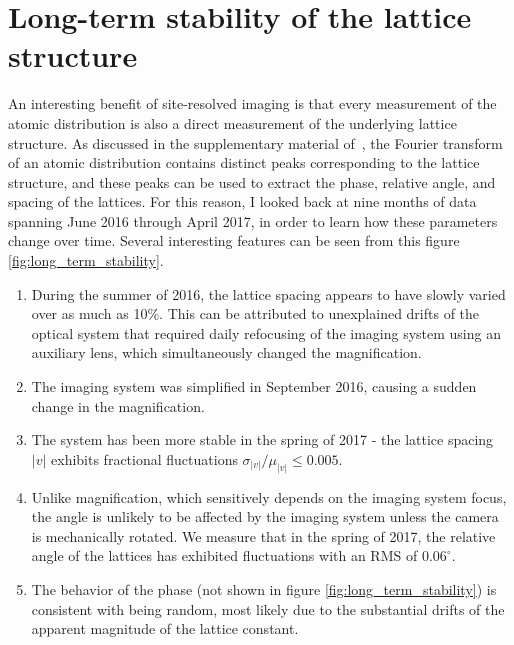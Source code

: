 \documentclass[twocolumn,aps,pra,showpacs,preprintnumbers,bibnotes]{revtex4-1}
\begin{document}
\section{Long-term stability of the lattice structure}
An interesting benefit of site-resolved imaging is that every measurement of the atomic distribution is also a direct measurement of the underlying lattice structure. 
As discussed in the supplementary material of~\cite{Parsons2016, Greif2016}, the Fourier transform of an atomic distribution contains distinct peaks corresponding to the lattice structure, and these peaks can be used to extract the phase, relative angle, and spacing of the lattices.
For this reason, I looked back at nine months of data spanning June 2016 through April 2017, in order to learn how these parameters change over time.
Several interesting features can be seen from this figure \ref{fig:long_term_stability}.
\begin{enumerate}
  \item During the summer of 2016, the lattice spacing appears to have slowly varied over as much as 10\%.
    This can be attributed to unexplained drifts of the optical system that required daily refocusing of the imaging system using an auxiliary lens, which simultaneously changed the magnification. 
  \item The imaging system was simplified in September 2016, causing a sudden change in the magnification. 
  \item The system has been more stable in the spring of 2017 - the lattice spacing $|v|$ exhibits fractional fluctuations $\sigma_{|v|}/\mu_{|v|}\leq 0.005$.
  \item Unlike magnification, which sensitively depends on the imaging system focus, the angle is unlikely to be affected by the imaging system unless the camera is mechanically rotated. We measure that in the spring of 2017, the relative angle of the lattices has exhibited fluctuations with an RMS of $0.06^\circ$.
  \item The behavior of the phase (not shown in figure \ref{fig:long_term_stability}) is consistent with being random, most likely due to the substantial drifts of the apparent magnitude of the lattice constant.
\end{enumerate}
\end{document}
